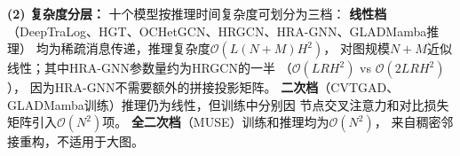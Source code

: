 \begin{table}[t]
\begin{minipage}{\textwidth}
\medskip
\textbf{(2) 复杂度分层：}
十个模型按推理时间复杂度可划分为三档：
\textbf{线性档}（DeepTraLog、HGT、OCHetGCN、HRGCN、HRA-GNN、GLADMamba推理）
均为稀疏消息传递，推理复杂度$\mathcal{O}(L(N+M)H^2)$，
对图规模$N+M$近似线性；其中HRA-GNN参数量约为HRGCN的一半
（$\mathcal{O}(LRH^2)$ vs $\mathcal{O}(2LRH^2)$），
因为HRA-GNN不需要额外的拼接投影矩阵。
\textbf{二次档}（CVTGAD、GLADMamba训练）推理仍为线性，但训练中分别因
节点交叉注意力和对比损失矩阵引入$\mathcal{O}(N^2)$项。
\textbf{全二次档}（MUSE）训练和推理均为$\mathcal{O}(N^2)$，
来自稠密邻接重构，不适用于大图。
\end{minipage}
\end{table}
